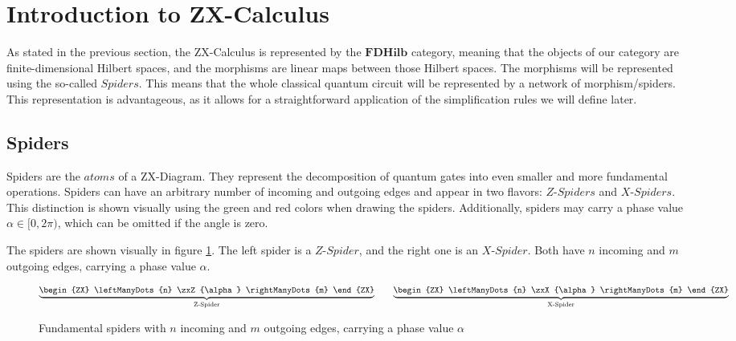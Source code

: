 \section{Introduction to ZX-Calculus}

As stated in the previous section, the ZX-Calculus is represented by the
$\mathbf{FDHilb}$ category, meaning that the objects of our category are finite-dimensional Hilbert spaces, and the morphisms are linear maps between those Hilbert spaces. The morphisms will be represented using the so-called $\textit{Spiders}$. This means that the whole classical quantum circuit will be represented by a network of morphism/spiders. This representation is advantageous, as it allows for a straightforward application of the simplification rules we will define later.

\subsection{Spiders}

Spiders are the $\textit{atoms}$ of a ZX-Diagram. They represent the decomposition of quantum gates into even smaller and more fundamental operations.
Spiders can have an arbitrary number of incoming and outgoing edges and appear in two flavors: $\textit{Z-Spiders}$ and $\textit{X-Spiders}$. This distinction is shown visually using the green and red colors when drawing the spiders.
Additionally, spiders may carry a phase value $\alpha \in [0, 2\pi)$, which can be omitted if the angle is zero.

The spiders are shown visually in figure \ref{fig:spiders-visual}. The left spider is a $\textit{Z-Spider}$, and the right one is an $\textit{X-Spider}$. Both have $n$ incoming and $m$ outgoing edges, carrying a phase value $\alpha$.

\begin{figure}[h]
    \centering
    \begin{align*}
        \underbrace{
            \begin{ZX}
                \leftManyDots{n}  \zxZ{\alpha} \rightManyDots{m}
            \end{ZX}
        }_{\text{Z-Spider}}
        \qquad
        \underbrace{
            \begin{ZX}
                \leftManyDots{n}  \zxX{\alpha} \rightManyDots{m}
            \end{ZX}
        }_{\text{X-Spider}}
    \end{align*}
    \caption{Fundamental spiders with $n$ incoming and $m$ outgoing edges, carrying a phase value $\alpha$}
    \label{fig:spiders-visual}
\end{figure}


